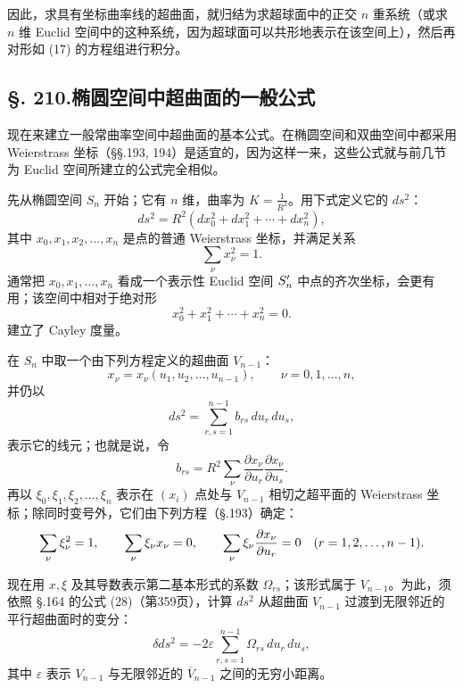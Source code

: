 因此，求具有坐标曲率线的超曲面，就归结为求超球面中的正交 $n$ 重系统（或求 $n$ 维 Euclid 空间中的这种系统，因为超球面可以共形地表示在该空间上），然后再对形如 (17) 的方程组进行积分。

\subsection*{\S. 210.\quad 椭圆空间中超曲面的一般公式}

现在来建立一般常曲率空间中超曲面的基本公式。在椭圆空间和双曲空间中都采用 Weierstrass 坐标（\S\S.193, 194）是适宜的，因为这样一来，这些公式就与前几节为 Euclid 空间所建立的公式完全相似。

先从椭圆空间 $S_n$ 开始；它有 $n$ 维，曲率为 $K=\frac1{R^2}$。用下式定义它的 $ds^2$：
\[
\tag{19}
ds^2=R^2(dx_0^2+dx_1^2+\cdots+dx_n^2),
\]
其中 $x_0,x_1,x_2,\ldots,x_n$ 是点的普通 Weierstrass 坐标，并满足关系
\[
\tag{20}
\sum_\nu x_\nu^2=1.
\]
通常把 $x_0,x_1,\ldots,x_n$ 看成一个表示性 Euclid 空间 $S'_n$ 中点的齐次坐标，会更有用；该空间中相对于绝对形
\[
\tag{21}
x_0^2+x_1^2+\cdots+x_n^2=0.
\]
建立了 Cayley 度量。

在 $S_n$ 中取一个由下列方程定义的超曲面 $V_{n-1}$：
\[
x_\nu=x_\nu(u_1,u_2,\ldots,u_{n-1}),\qquad \nu=0,1,\ldots,n,
\]
并仍以
\[
\tag{22}
ds^2=\sum_{r,s=1}^{n-1}b_{rs}\,du_r\,du_s,
\]
表示它的线元；也就是说，令
\[
\tag{23}
b_{rs}=R^2\sum_\nu\frac{\partial x_\nu}{\partial u_r}\frac{\partial x_\nu}{\partial u_s}.
\]
再以 $\xi_0,\xi_1,\xi_2,\ldots,\xi_n$ 表示在 $(x_i)$ 点处与 $V_{n-1}$ 相切之超平面的 Weierstrass 坐标；除同时变号外，它们由下列方程（\S.193）确定：
\[
\sum_\nu\xi_\nu^2=1,\qquad
\sum_\nu\xi_\nu x_\nu=0,\qquad
\sum_\nu\xi_\nu\frac{\partial x_\nu}{\partial u_r}=0\quad(r=1,2,\ldots,n-1).
\]

现在用 $x,\xi$ 及其导数表示第二基本形式的系数 $\Omega_{rs}$；该形式属于 $V_{n-1}$。为此，须依照 \S.164 的公式 (28)（第359页），计算 $ds^2$ 从超曲面 $V_{n-1}$ 过渡到无限邻近的平行超曲面时的变分：
\[
\delta ds^2=-2\varepsilon\sum_{r,s=1}^{n-1}\Omega_{rs}\,du_r\,du_s,
\]
其中 $\varepsilon$ 表示 $V_{n-1}$ 与无限邻近的 $\overline{V}_{n-1}$ 之间的无穷小距离。

